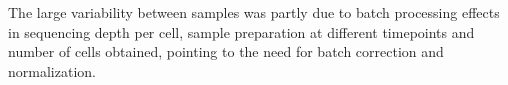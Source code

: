 

The large variability between samples was partly due to batch processing effects in sequencing depth per cell, sample preparation at different timepoints and number of cells obtained, pointing to the need for batch correction and normalization.





